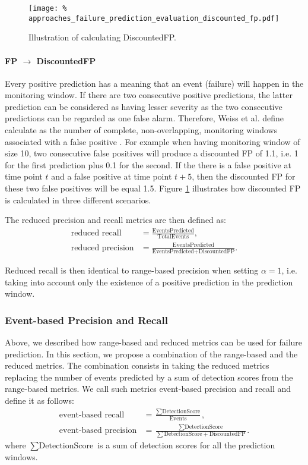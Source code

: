 \begin{figure}
    \texttt{[image: \%
        approaches\_failure\_prediction\_evaluation\_discounted\_fp.pdf]}
    \centering
    \caption{Illustration of calculating DiscountedFP.}
    \label{fig:approaches_failure_prediction_evaluation_discounted_fp}
\end{figure}

\paragraph{FP $\rightarrow$ DiscountedFP}
Every positive prediction has a meaning that an event (failure) will happen in the monitoring window.
If there are two consecutive positive predictions, the latter prediction can be considered as having lesser severity as the two consecutive predictions can be regarded as one false alarm.
Therefore, Weiss et al. define calculate as the number of complete, non-overlapping, monitoring windows associated with a false positive \cite{weiss1998learning}.
For example when having monitoring window of size 10, two consecutive false positives will produce a discounted FP of 1.1, i.e. 1 for the first prediction plus 0.1 for the second.
If the there is a false positive at time point $t$ and a false positive at time point $t + 5$, then the discounted FP for these two false positives will be equal 1.5.
Figure \ref{fig:approaches_failure_prediction_evaluation_discounted_fp} illustrates how discounted FP is calculated in three different scenarios.

The reduced precision and recall metrics are then defined as:
\begin{align*}
    \text{reduced recall} &= \frac{\text{EventsPredicted}}{\text{TotalEvents}},\\
    \text{reduced precision} &=
    \frac{\text{EventsPredicted}}
    {\text{EventsPredicted} + \text{DiscountedFP}}.
\end{align*}

Reduced recall is then identical to range-based precision when setting $\alpha = 1$, i.e. taking into account only the existence of a positive prediction in the prediction window.

\subsubsection{Event-based Precision and Recall}

Above, we described how range-based and reduced metrics can be used for failure prediction.
In this section, we propose a combination of the range-based and the reduced metrics.
The combination consists in taking the reduced metrics replacing the number of events predicted by a sum of detection scores from the range-based metrics.
We call such metrics event-based precision and recall and define it as follows:
\begin{align*}
    \text{event-based recall} &= \frac{\sum\text{DetectionScore}}{\text{Events}},\\
    \text{event-based precision} &=
    \frac{\sum\text{DetectionScore}}
    {\sum\text{DetectionScore} + \text{DiscountedFP}}.
\end{align*}
where $\sum\text{DetectionScore}$ is a sum of detection scores for all the prediction windows.